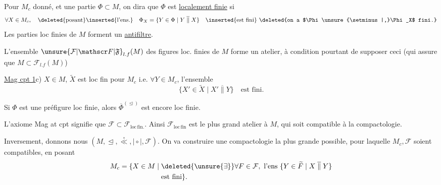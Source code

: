 Pour $M_c$ donné, et une partie $\Phi\subset M$, on dira que $\Phi$ est \uline{localement finie} si 
\[
\forall X\in M_c,\quad
\text{\deleted{posant}\inserted{l'ens.}}\quad
\Phi_X=\{Y\in\Phi\mid Y\mathrel{\overline{\parallel}}X\}
\quad\text{\inserted{est fini} \deleted{on a $\Phi\unsure{\setminus|,}\Phi_X$ fini.}}
\]
Les parties loc finies de $M$ forment un \uline{antifiltre}.

L'ensemble  $\unsure{\mathcal F|\mathscr F|\mathfrak F}_{l.f}(M)$ des figures loc. finies de $M$ forme un atelier, à condition pourtant de supposer  ceci (qui assure que $M\subset\mathcal F_{l.f}(M)$)

\uline{Mag cpt 1}\quad c)  $X\in M$, $\widetilde X$ est loc fin pour $M_c$ i.e. $\forall Y\in M_c$, l'ensemble 
\[
\{X'\in\widetilde X\mid X'\mathrel{\overline{\parallel}}Y\}\quad\text{est fini.}
\]

Si $\Phi$ est une préfigure loc finie, alors $\overline\Phi^{(\trianglelefteq)}$ est encore loc finie.

L'axiome Mag at cpt signifie que $\mathcal F\subset\mathcal F_{\mathrm{loc\,fin.}}$. Ainsi $\mathcal F_{\mathrm{loc\,fin}}$ est le plus grand atelier  à $M$, qui soit compatible à la compactologie.

Inversement, donnons nous $(M,\trianglelefteq,\overset{\circ}{\ll},\mathrel{\mid\circ\mid},\mathcal F)$. On va construire une  compactologie la plus grande possible, pour laquelle $M_c,\mathcal F$ soient compatibles, en posant
\[
\begin{aligned}
M_c=\{X\in M\mid {}&\deleted{\unsure{\exists}}\forall F\in\mathcal F,\ \text{l'ens }\{Y\in\widetilde F\mid X\mathrel{\overline{\parallel}}Y\}\\
&\text{est fini}\}.
\end{aligned}
\]
